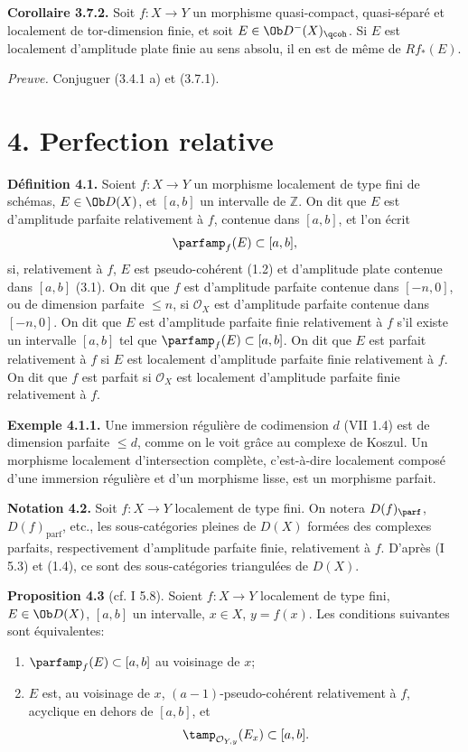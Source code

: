 \documentclass[11pt]{article}
\begin{document}
\textbf{Corollaire 3.7.2.} Soit \(f:X\to Y\) un morphisme quasi-compact, quasi-séparé et localement de tor-dimension finie, et soit \(E\in\Ob D^{-}(X)_{\qcoh}\). Si \(E\) est localement d'amplitude plate finie au sens absolu, il en est de même de \(Rf_*(E)\).

\emph{Preuve.} Conjuguer (3.4.1 a) et (3.7.1).

\section*{4. Perfection relative}

\textbf{Définition 4.1.} Soient \(f:X\to Y\) un morphisme localement de type fini de schémas, \(E\in\Ob D(X)\), et \([a,b]\) un intervalle de \(\mathbb Z\). On dit que \(E\) est d'amplitude parfaite relativement à \(f\), contenue dans \([a,b]\), et l'on écrit
\[
 \parfamp_f(E)\subset[a,b],
\]
si, relativement à \(f\), \(E\) est pseudo-cohérent (1.2) et d'amplitude plate contenue dans \([a,b]\) (3.1). On dit que \(f\) est d'amplitude parfaite contenue dans \([-n,0]\), ou de dimension parfaite \(\leq n\), si \(\mathcal O_X\) est d'amplitude parfaite contenue dans \([-n,0]\). On dit que \(E\) est d'amplitude parfaite finie relativement à \(f\) s'il existe un intervalle \([a,b]\) tel que \(\parfamp_f(E)\subset[a,b]\). On dit que \(E\) est parfait relativement à \(f\) si \(E\) est localement d'amplitude parfaite finie relativement à \(f\). On dit que \(f\) est parfait si \(\mathcal O_X\) est localement d'amplitude parfaite finie relativement à \(f\).

\textbf{Exemple 4.1.1.} Une immersion régulière de codimension \(d\) (VII 1.4) est de dimension parfaite \(\leq d\), comme on le voit grâce au complexe de Koszul. Un morphisme localement d'intersection complète, c'est-à-dire localement composé d'une immersion régulière et d'un morphisme lisse, est un morphisme parfait.

\textbf{Notation 4.2.} Soit \(f:X\to Y\) localement de type fini. On notera \(D(f)_{\parf}\), \(D(f)_{\mathrm{parf}}\), etc., les sous-catégories pleines de \(D(X)\) formées des complexes parfaits, respectivement d'amplitude parfaite finie, relativement à \(f\). D'après (I 5.3) et (1.4), ce sont des sous-catégories triangulées de \(D(X)\).

\textbf{Proposition 4.3} (cf. I 5.8). Soient \(f:X\to Y\) localement de type fini, \(E\in\Ob D(X)\), \([a,b]\) un intervalle, \(x\in X\), \(y=f(x)\). Les conditions suivantes sont équivalentes:
\begin{enumerate}[label=\roman*)]
\item \(\parfamp_f(E)\subset[a,b]\) au voisinage de \(x\);
\item \(E\) est, au voisinage de \(x\), \((a-1)\)-pseudo-cohérent relativement à \(f\), acyclique en dehors de \([a,b]\), et
\[
 \tamp_{\mathcal O_{Y,y}}(E_x)
 \subset[a,b].
\]
\end{enumerate}
\end{document}
